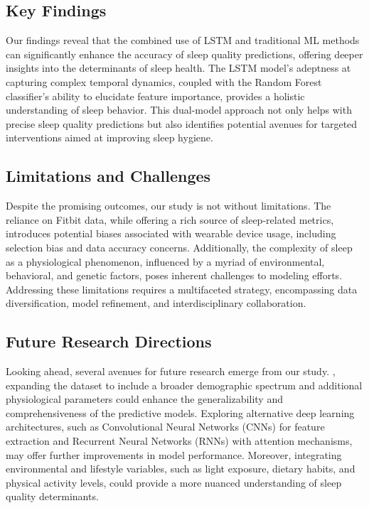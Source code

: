 \documentclass[10pt]{extarticle}
\begin{document}
\subsection{Key Findings}

Our findings reveal that the combined use of LSTM and traditional ML methods can significantly enhance the accuracy of sleep quality predictions, offering deeper insights into the determinants of sleep health. The LSTM model's adeptness at capturing complex temporal dynamics, coupled with the Random Forest classifier's ability to elucidate feature importance, provides a holistic understanding of sleep behavior. This dual-model approach not only helps with precise sleep quality predictions but also identifies potential avenues for targeted interventions aimed at improving sleep hygiene.

\subsection{Limitations and Challenges}

Despite the promising outcomes, our study is not without limitations. The reliance on Fitbit data, while offering a rich source of sleep-related metrics, introduces potential biases associated with wearable device usage, including selection bias and data accuracy concerns. Additionally, the complexity of sleep as a physiological phenomenon, influenced by a myriad of environmental, behavioral, and genetic factors, poses inherent challenges to modeling efforts. Addressing these limitations requires a multifaceted strategy, encompassing data diversification, model refinement, and interdisciplinary collaboration.

\subsection{Future Research Directions}

Looking ahead, several avenues for future research emerge from our study. , expanding the dataset to include a broader demographic spectrum and additional physiological parameters could enhance the generalizability and comprehensiveness of the predictive models. Exploring alternative deep learning architectures, such as Convolutional Neural Networks (CNNs) for feature extraction and Recurrent Neural Networks (RNNs) with attention mechanisms, may offer further improvements in model performance. Moreover, integrating environmental and lifestyle variables, such as light exposure, dietary habits, and physical activity levels, could provide a more nuanced understanding of sleep quality determinants.
\end{document}
